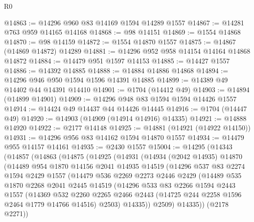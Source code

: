 \begin{lexlean}{R0}
\begin{coremodule}
@14863 := @14296 @960 @83 @14169 @1594 @14289 @1557
@14867 := @14281 @763 @959 @14165 @14168
@14868 := @98 @14151
@14869 := @1554 @14868
@14870 := @98 @14159
@14872 := @1554 @14870 @1557
@14875 := @14867 (@14869 @14872) @14289
@14881 := @14296 @952 @958 @14154 @14164 @14868 @14872
@14884 := @14479 @951 @1597 @14153
@14885 := @14427 @1557
@14886 := @14392 @14885
@14888 := @14884 @14886 @14868
@14894 := @14296 @946 @950 @1594 @1596 @14391 @14885
@14899 := @14389 @49 @14402 @44 @14391 @14410
@14901 := @1704 (@14412 @49)
@14903 := @14894 (@14899 @14901)
@14909 := @14296 @948 @83 @1594 @1594 @14426 @1557
@14914 := @14424 @49 @14437 @44 @14426 @14445
@14916 := @1704 (@14447 @49)
@14920 := @14903 (@14909 (@14914 @14916) @14335)
@14921 := @14888 @14920
@14922 := @2177 @14148
@14925 := @14881 (@14921 (@14922 @14150))
@14931 := @14296 @956 @83 @14162 @1594 @14870 @1557
@14934 := @14479 @955 @14157 @14161
@14935 := @2430 @1557
@15004 := @14295
    (@14343
      (@14857
        (@14863
          (@14875
            (@14925
              (@14931
                (@14934
                  (@2042 @14935)
                  @14870
                  (@14489
                    @954
                    @1870
                    @14156
                    @2041
                    @14935
                    @14519
                    (@14296
                      @537
                      @83
                      @2274
                      @1594
                      @2429
                      @1557
                      (@14479
                        @536
                        @2269
                        @2273
                        @2446
                        @2429
                        (@14489
                          @535
                          @1870
                          @2268
                          @2041
                          @2445
                          @14519
                          (@14296
                            @533
                            @83
                            @2266
                            @1594
                            @2443
                            @1557
                            (@14369
                              @532
                              @2260
                              @2265
                              @2466
                              @2443
                              (@14725 @244 @2258 @1596 @2464 @1779 @14766 @14516)
                              @2503)
                            @14335))
                        @2509)
                      @14335))
                  (@2178 @2271))

\end{coremodule}
\end{lexlean}
